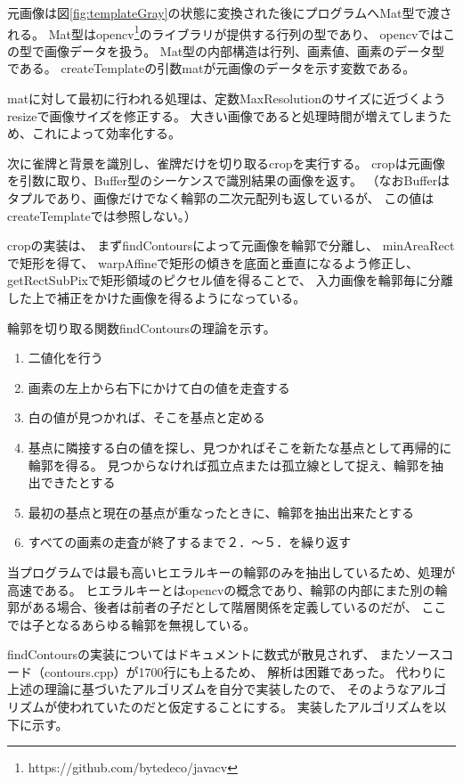 \documentclass{jsarticle}
\begin{document}
\begin{multicols}{2}
元画像は図\ref{fig:templateGray}の状態に変換された後にプログラムへMat型で渡される。
Mat型はopencv\footnote{https://github.com/bytedeco/javacv}のライブラリが提供する行列の型であり、
opencvではこの型で画像データを扱う。
Mat型の内部構造は行列、画素値、画素のデータ型である。
createTemplateの引数matが元画像のデータを示す変数である。

matに対して最初に行われる処理は、定数MaxResolutionのサイズに近づくよう
resizeで画像サイズを修正する。
大きい画像であると処理時間が増えてしまうため、これによって効率化する。

次に雀牌と背景を識別し、雀牌だけを切り取るcropを実行する。
cropは元画像を引数に取り、Buffer型のシーケンスで識別結果の画像を返す。
（なおBufferはタプルであり、画像だけでなく輪郭の二次元配列も返しているが、
この値はcreateTemplateでは参照しない。）

cropの実装は、
まずfindContoursによって元画像を輪郭で分離し、
minAreaRectで矩形を得て、
warpAffineで矩形の傾きを底面と垂直になるよう修正し、
getRectSubPixで矩形領域のピクセル値を得ることで、
入力画像を輪郭毎に分離した上で補正をかけた画像を得るようになっている。

輪郭を切り取る関数findContoursの理論を示す。
\begin{enumerate}
\item 二値化を行う
\item 画素の左上から右下にかけて白の値を走査する
\item 白の値が見つかれば、そこを基点と定める
\item 基点に隣接する白の値を探し、見つかればそこを新たな基点として再帰的に輪郭を得る。
		  見つからなければ孤立点または孤立線として捉え、輪郭を抽出できたとする
\item 最初の基点と現在の基点が重なったときに、輪郭を抽出出来たとする
\item すべての画素の走査が終了するまで２．～５．を繰り返す
\end{enumerate}

当プログラムでは最も高いヒエラルキーの輪郭のみを抽出しているため、処理が高速である。
ヒエラルキーとはopencvの概念であり、輪郭の内部にまた別の輪郭がある場合、後者は前者の子だとして階層関係を定義しているのだが、
ここでは子となるあらゆる輪郭を無視している。

findContoursの実装についてはドキュメントに数式が散見されず、
またソースコード（contours.cpp）が1700行にも上る\cite{contours}ため、
解析は困難であった。
代わりに上述の理論に基づいたアルゴリズムを自分で実装したので、
そのようなアルゴリズムが使われていたのだと仮定することにする。
実装したアルゴリズムを以下に示す。

\end{multicols}
\end{document}
